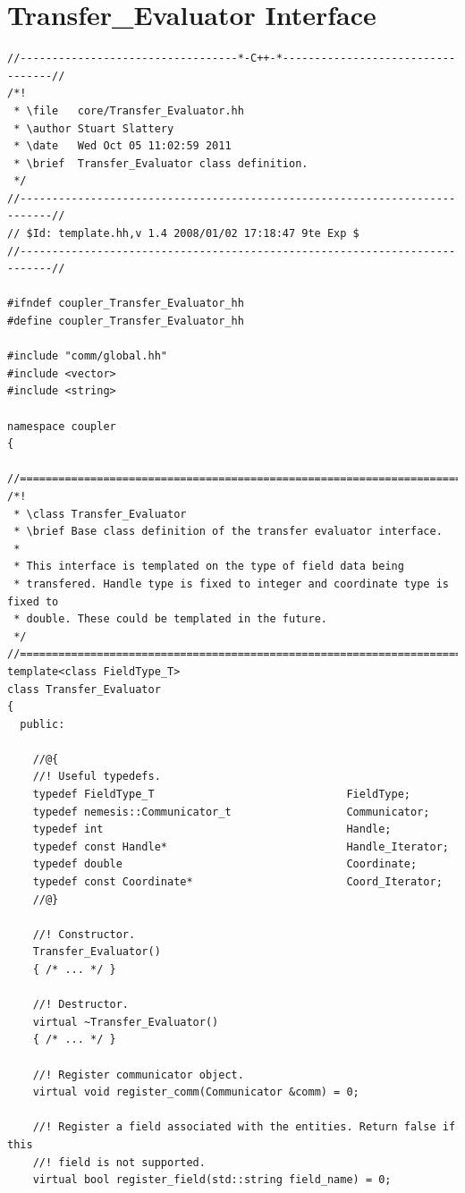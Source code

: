 \documentclass[letterpaper]{article}
\begin{document}
\section{Transfer\_Evaluator Interface}
\begin{lstlisting}
//----------------------------------*-C++-*----------------------------------//
/*!
 * \file   core/Transfer_Evaluator.hh
 * \author Stuart Slattery
 * \date   Wed Oct 05 11:02:59 2011
 * \brief  Transfer_Evaluator class definition.
 */
//---------------------------------------------------------------------------//
// $Id: template.hh,v 1.4 2008/01/02 17:18:47 9te Exp $
//---------------------------------------------------------------------------//

#ifndef coupler_Transfer_Evaluator_hh
#define coupler_Transfer_Evaluator_hh

#include "comm/global.hh"
#include <vector>
#include <string>

namespace coupler
{

//===========================================================================//
/*!
 * \class Transfer_Evaluator
 * \brief Base class definition of the transfer evaluator interface.
 *
 * This interface is templated on the type of field data being
 * transfered. Handle type is fixed to integer and coordinate type is fixed to
 * double. These could be templated in the future.
 */
//===========================================================================//
template<class FieldType_T>
class Transfer_Evaluator 
{
  public:

    //@{
    //! Useful typedefs.
    typedef FieldType_T                              FieldType;
    typedef nemesis::Communicator_t                  Communicator;
    typedef int                                      Handle;
    typedef const Handle*                            Handle_Iterator;
    typedef double                                   Coordinate;
    typedef const Coordinate*                        Coord_Iterator;
    //@}

    //! Constructor.
    Transfer_Evaluator()
    { /* ... */ }

    //! Destructor.
    virtual ~Transfer_Evaluator()
    { /* ... */ }

    //! Register communicator object.
    virtual void register_comm(Communicator &comm) = 0;

    //! Register a field associated with the entities. Return false if this
    //! field is not supported.
    virtual bool register_field(std::string field_name) = 0;


\end{lstlisting}
\end{document}
